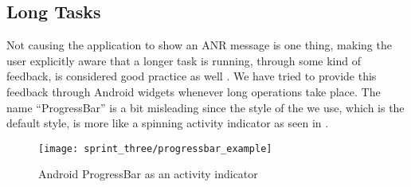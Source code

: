 \subsection{Long Tasks}

Not causing the application to show an ANR message is one thing, making the user explicitly aware that a longer task is running, through some kind of feedback, is considered good practice as well \parencite{benyon}. We have tried to provide this feedback through Android  widgets whenever long operations take place. The name ``ProgressBar'' is a bit misleading since the style of the  we use, which is the default style, is more like a spinning activity indicator as seen in . 

\begin{figure}[!htbp]
        \centering
        \texttt{[image: sprint\_three/progressbar\_example]}
        \caption{Android ProgressBar as an activity indicator}
        \label{fig:activity_indicator}
\end{figure}